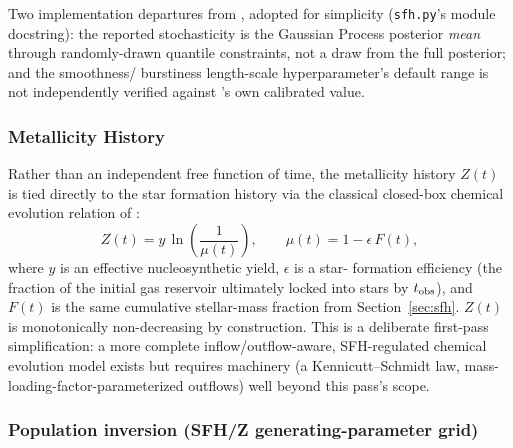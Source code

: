 \documentclass{aastex7}
\begin{document}
Two implementation departures from \citet{Iyer2019}, adopted for simplicity
(\texttt{sfh.py}'s module docstring): the reported stochasticity is the
Gaussian Process posterior \emph{mean} through randomly-drawn quantile
constraints, not a draw from the full posterior; and the smoothness/
burstiness length-scale hyperparameter's default range is not independently
verified against \citeauthor{Iyer2019}'s own calibrated value.

\subsubsection{Metallicity History} \label{sec:metallicity}
Rather than an independent free function of time, the metallicity history
$Z(t)$ is tied directly to the star formation history via the classical
closed-box chemical evolution relation of \citet{SearleSargent1972}:
\begin{equation}
    Z(t) = y \, \ln\left(\frac{1}{\mu(t)}\right), \qquad
    \mu(t) = 1 - \epsilon \, F(t),
\end{equation}
where $y$ is an effective nucleosynthetic yield, $\epsilon$ is a star-
formation efficiency (the fraction of the initial gas reservoir ultimately
locked into stars by $t_{\rm obs}$), and $F(t)$ is the same cumulative
stellar-mass fraction from Section~\ref{sec:sfh}. $Z(t)$ is monotonically
non-decreasing by construction. This is a deliberate first-pass
simplification: a more complete inflow/outflow-aware, SFH-regulated
chemical evolution model exists \citep{YinShenHao2023} but requires
machinery (a Kennicutt--Schmidt law, mass-loading-factor-parameterized
outflows) well beyond this pass's scope.

\subsubsection{Population inversion (SFH/Z generating-parameter grid)} \label{sec:population-inversion}
\end{document}
